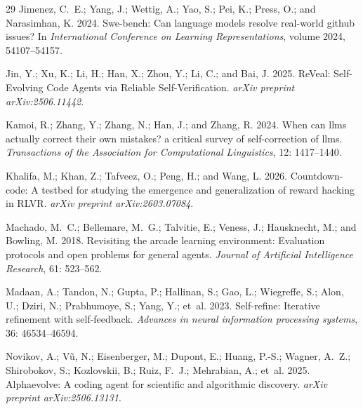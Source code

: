 \documentclass[letterpaper]{article} \usepackage{aaai2027}  \usepackage[hyphens]{url}  \usepackage{graphicx} \urlstyle{rm} \def\UrlFont{\rm}  \usepackage{natbib}  \usepackage{caption} \usepackage{amsfonts} \usepackage{multirow} \frenchspacing  \usepackage{algorithm}
\begin{document}
\begin{thebibliography}{29}
Jimenez, C.~E.; Yang, J.; Wettig, A.; Yao, S.; Pei, K.; Press, O.; and
  Narasimhan, K. 2024.
\newblock Swe-bench: Can language models resolve real-world github issues?
\newblock In \emph{International Conference on Learning Representations},
  volume 2024, 54107--54157.

Jin, Y.; Xu, K.; Li, H.; Han, X.; Zhou, Y.; Li, C.; and Bai, J. 2025.
\newblock ReVeal: Self-Evolving Code Agents via Reliable Self-Verification.
\newblock \emph{arXiv preprint arXiv:2506.11442}.

Kamoi, R.; Zhang, Y.; Zhang, N.; Han, J.; and Zhang, R. 2024.
\newblock When can llms actually correct their own mistakes? a critical survey
  of self-correction of llms.
\newblock \emph{Transactions of the Association for Computational Linguistics},
  12: 1417--1440.

Khalifa, M.; Khan, Z.; Tafveez, O.; Peng, H.; and Wang, L. 2026.
\newblock Countdown-code: A testbed for studying the emergence and
  generalization of reward hacking in RLVR.
\newblock \emph{arXiv preprint arXiv:2603.07084}.

Machado, M.~C.; Bellemare, M.~G.; Talvitie, E.; Veness, J.; Hausknecht, M.; and
  Bowling, M. 2018.
\newblock Revisiting the arcade learning environment: Evaluation protocols and
  open problems for general agents.
\newblock \emph{Journal of Artificial Intelligence Research}, 61: 523--562.

Madaan, A.; Tandon, N.; Gupta, P.; Hallinan, S.; Gao, L.; Wiegreffe, S.; Alon,
  U.; Dziri, N.; Prabhumoye, S.; Yang, Y.; et~al. 2023.
\newblock Self-refine: Iterative refinement with self-feedback.
\newblock \emph{Advances in neural information processing systems}, 36:
  46534--46594.

Novikov, A.; V{\~u}, N.; Eisenberger, M.; Dupont, E.; Huang, P.-S.; Wagner,
  A.~Z.; Shirobokov, S.; Kozlovskii, B.; Ruiz, F.~J.; Mehrabian, A.; et~al.
  2025.
\newblock Alphaevolve: A coding agent for scientific and algorithmic discovery.
\newblock \emph{arXiv preprint arXiv:2506.13131}.


\end{thebibliography}
\end{document}
